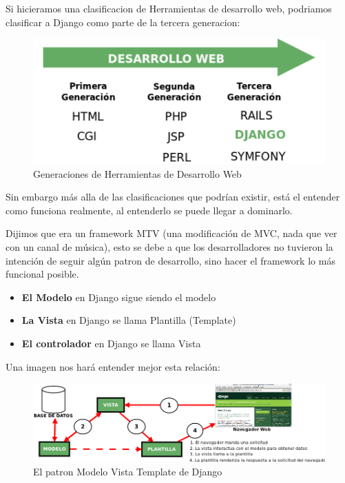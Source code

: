 Si hicieramos una clasificacion de Herramientas de desarrollo web, podriamos
clasificar a Django como parte de la tercera generacion:


\begin{figure}[h]
    \centering
    \includegraphics[scale=0.7]{resourse/desarrolloweb.png}
    \caption{Generaciones de Herramientas de Desarrollo Web}
    \label{fig:02}
\end{figure}   

Sin embargo más alla de las clasificaciones que podr\'ian existir, está el
entender como funciona realmente, al entenderlo se puede llegar a dominarlo.

Dijimos que era un framework MTV (una modificación de MVC, nada que ver con
un canal de m\'usica), esto se debe a que los desarrolladores no tuvieron la
 intención de seguir algún patron de desarrollo, sino hacer el framework lo
más funcional posible.

\begin{itemize}
    \item {\bfseries  El Modelo} en Django sigue siendo el modelo
    \item {\bfseries La Vista} en Django se llama Plantilla (Template)
    \item {\bfseries El controlador} en Django se llama Vista
\end{itemize}

Una imagen nos hará entender mejor esta relación:

\begin{figure}[h]
    \centering
    \includegraphics[scale=0.5]{resourse/esquema-mtv.png}
    \caption{El patron Modelo Vista Template de Django}
    \label{fig:04}
\end{figure}   



